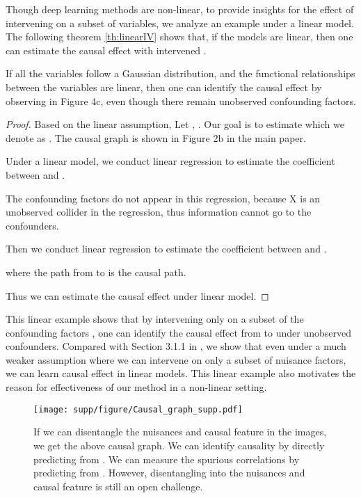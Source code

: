 \documentclass[final]{cvpr}
\begin{document}
\begin{subappendices}
Though deep learning methods are non-linear, to provide insights for the effect of intervening on a subset of variables, we analyze an example under a linear model. The following theorem \ref{th:linearIV} shows that, if the models are linear, then one can estimate the causal effect with intervened .

\begin{theorem}\label{th:linearIV}
If all the variables follow a Gaussian distribution, and the functional relationships between the variables are linear, then one can identify the causal effect by observing  in Figure 4c, even though there remain unobserved confounding factors.
\end{theorem}

\begin{proof}
Based on the linear assumption,
Let ,  .
Our goal is to estimate  which we denote as . The causal graph is shown in Figure 2b in the main paper.

Under a linear model, we conduct linear regression to estimate the coefficient  between  and .



The confounding factors do not appear in this regression, because X is an unobserved collider in the regression, thus information cannot go to the confounders.

Then we conduct linear regression to estimate the coefficient  between  and .



where the path from  to  is the causal path.

Thus we can estimate the causal effect  under linear model.
\end{proof}

This linear example shows that by intervening only on a subset of the confounding factors , one can identify the causal effect from  to  under unobserved confounders. Compared with Section 3.1.1 in \cite{ilse2020designing}, we show that even under a much weaker assumption where we can intervene on only a subset of nuisance factors, we can learn causal effect in linear models. This linear example also motivates the reason for effectiveness of our method in a non-linear setting.  

\begin{figure}[t]
  \centering
  \texttt{[image: supp/figure/Causal\_graph\_supp.pdf]}
  \caption{If we can disentangle the nuisances  and causal feature  in the images, we get the above causal graph. We can identify causality by directly predicting  from . We can measure the spurious correlations by predicting  from . However, disentangling  into the nuisances  and causal feature  is still an open challenge.}


\end{figure}
\end{subappendices}
\end{document}
